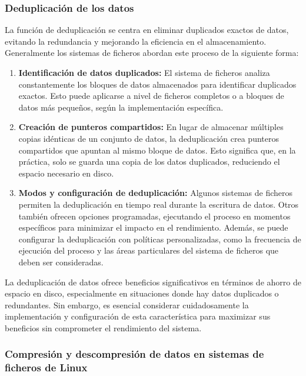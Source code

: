 \subsubsection{Deduplicación de los datos}

La función de deduplicación se centra en eliminar duplicados exactos de datos, evitando la redundancia y mejorando la eficiencia en el almacenamiento. Generalmente los sistemas de ficheros abordan este proceso de la siguiente forma:

\begin{enumerate}
    \item \textbf{Identificación de datos duplicados:}
        El sistema de ficheros analiza constantemente los bloques de datos almacenados para identificar duplicados exactos. Esto puede aplicarse a nivel de ficheros completos o a bloques de datos más pequeños, según la implementación específica.
    
    \item \textbf{Creación de punteros compartidos:}
        En lugar de almacenar múltiples copias idénticas de un conjunto de datos, la deduplicación crea punteros compartidos que apuntan al mismo bloque de datos. Esto significa que, en la práctica, solo se guarda una copia de los datos duplicados, reduciendo el espacio necesario en disco.
    
    \item \textbf{Modos y configuración de deduplicación:}
        Algunos sistemas de ficheros permiten la deduplicación en tiempo real durante la escritura de datos. Otros también ofrecen opciones programadas, ejecutando el proceso en momentos específicos para minimizar el impacto en el rendimiento. Además, se puede configurar la deduplicación con políticas personalizadas, como la frecuencia de ejecución del proceso y las áreas particulares del sistema de ficheros que deben ser consideradas.
\end{enumerate}

La deduplicación de datos ofrece beneficios significativos en términos de ahorro de espacio en disco, especialmente en situaciones donde hay datos duplicados o redundantes. Sin embargo, es esencial considerar cuidadosamente la implementación y configuración de esta característica para maximizar sus beneficios sin comprometer el rendimiento del sistema.

\subsubsection{Compresión y descompresión de datos en sistemas de ficheros de Linux}


